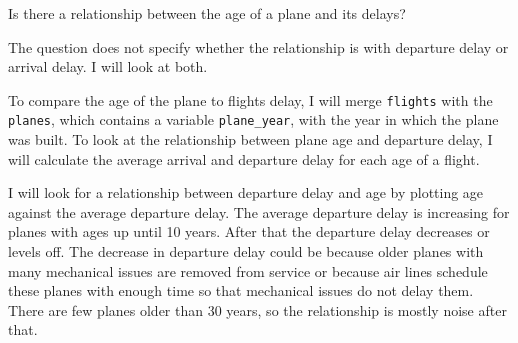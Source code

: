 \documentclass[]{book}
\newenvironment{Shaded}{\begin{snugshade}}{\end{snugshade}}
\newcommand{\DataTypeTok}[1]{\textcolor[rgb]{0.13,0.29,0.53}{#1}}
\newcommand{\KeywordTok}[1]{\textcolor[rgb]{0.13,0.29,0.53}{\textbf{#1}}}
\newcommand{\NormalTok}[1]{#1}
\newcommand{\OperatorTok}[1]{\textcolor[rgb]{0.81,0.36,0.00}{\textbf{#1}}}
\newcommand{\OtherTok}[1]{\textcolor[rgb]{0.56,0.35,0.01}{#1}}
\newcommand{\StringTok}[1]{\textcolor[rgb]{0.31,0.60,0.02}{#1}}
\theoremstyle{plain}
\theoremstyle{remark}
\begin{document}
Is there a relationship between the age of a plane and its delays?

The question does not specify whether the relationship is with departure
delay or arrival delay. I will look at both.

To compare the age of the plane to flights delay, I will merge
\texttt{flights} with the \texttt{planes}, which contains a variable
\texttt{plane\_year}, with the year in which the plane was built. To
look at the relationship between plane age and departure delay, I will
calculate the average arrival and departure delay for each age of a
flight.

\begin{Shaded}
\end{Shaded}

I will look for a relationship between departure delay and age by
plotting age against the average departure delay. The average departure
delay is increasing for planes with ages up until 10 years. After that
the departure delay decreases or levels off. The decrease in departure
delay could be because older planes with many mechanical issues are
removed from service or because air lines schedule these planes with
enough time so that mechanical issues do not delay them. There are few
planes older than 30 years, so the relationship is mostly noise after
that.
\end{document}
